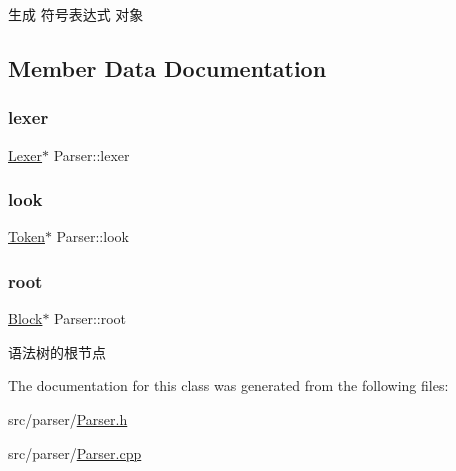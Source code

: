 生成 符号表达式 对象 



\subsection{Member Data Documentation}
\mbox{\label{class_parser_a8a8214126b0b0455e3ce375f3e9b20bf}} 
\subsubsection{\texorpdfstring{lexer}{lexer}}
{\footnotesize\ttfamily \hyperlink{class_lexer}{Lexer}$\ast$ Parser\+::lexer\hspace{0.3cm}{\ttfamily [private]}}

\mbox{\label{class_parser_ac5d56e87794ceab4e8346bf4a60a5625}} 
\subsubsection{\texorpdfstring{look}{look}}
{\footnotesize\ttfamily \hyperlink{class_token}{Token}$\ast$ Parser\+::look\hspace{0.3cm}{\ttfamily [private]}}

\mbox{\label{class_parser_a2c2aa893bb15b76ceea0330cad0c75cb}} 
\subsubsection{\texorpdfstring{root}{root}}
{\footnotesize\ttfamily \hyperlink{class_block}{Block}$\ast$ Parser\+::root\hspace{0.3cm}{\ttfamily [protected]}}

语法树的根节点 

The documentation for this class was generated from the following files\+:\begin{DoxyCompactItemize}
\item 
src/parser/\hyperlink{_parser_8h}{Parser.\+h}\item 
src/parser/\hyperlink{_parser_8cpp}{Parser.\+cpp}\end{DoxyCompactItemize}
